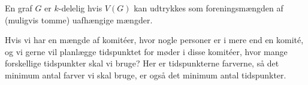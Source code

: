 \begin{definition}[$k$-delelighed]
En graf $G$ er $k$-delelig hvis $V(G)$ kan udtrykkes som foreningsmængden af (muligvis tomme) uafhængige mængder.
\end{definition}

\begin{example}
Hvis vi har en mængde af komitéer, hvor nogle personer er i mere end en komité, og vi gerne vil planlægge tidspunktet for møder i disse komitéer, hvor mange forskellige tidspunkter skal vi bruge? Her er tidspunkterne farverne, så det minimum antal farver vi skal bruge, er også det minimum antal tidspunkter.
\end{example}


